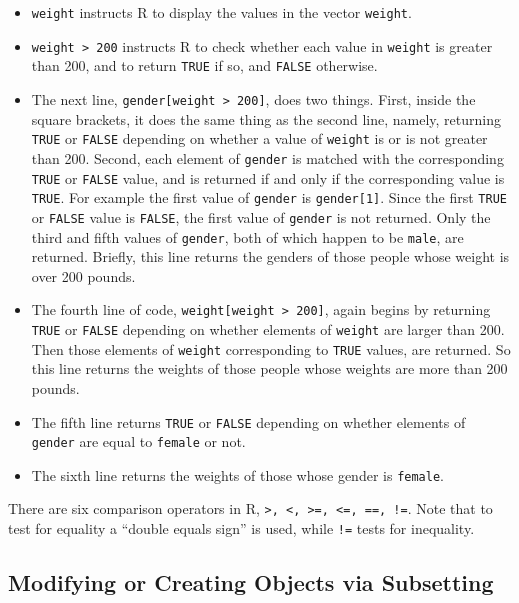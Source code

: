 \documentclass[]{krantz}
\providecommand{\tightlist}{%
  \setlength{\itemsep}{0pt}\setlength{\parskip}{0pt}}
\begin{document}
\begin{itemize}
\tightlist
\item
  \texttt{weight} instructs R to display the values in the vector \texttt{weight}.
\item
  \texttt{weight\ \textgreater{}\ 200} instructs R to check whether each value in \texttt{weight} is greater than 200, and to return \texttt{TRUE} if so, and \texttt{FALSE} otherwise.
\item
  The next line, \texttt{gender{[}weight\ \textgreater{}\ 200{]}}, does two things. First, inside the square brackets, it does the same thing as the second line, namely, returning \texttt{TRUE} or \texttt{FALSE} depending on whether a value of \texttt{weight} is or is not greater than 200. Second, each element of \texttt{gender} is matched with the corresponding \texttt{TRUE} or \texttt{FALSE} value, and is returned if and only if the corresponding value is \texttt{TRUE}. For example the first value of \texttt{gender} is \texttt{gender{[}1{]}}. Since the first \texttt{TRUE} or \texttt{FALSE} value is \texttt{FALSE}, the first value of \texttt{gender} is not returned. Only the third and fifth values of \texttt{gender}, both of which happen to be \texttt{male}, are returned. Briefly, this line returns the genders of those people whose weight is over 200 pounds.
\item
  The fourth line of code, \texttt{weight{[}weight\ \textgreater{}\ 200{]}}, again begins by returning \texttt{TRUE} or \texttt{FALSE} depending on whether elements of \texttt{weight} are larger than 200. Then those elements of \texttt{weight} corresponding to \texttt{TRUE} values, are returned. So this line returns the weights of those people whose weights are more than 200 pounds.
\item
  The fifth line returns \texttt{TRUE} or \texttt{FALSE} depending on whether elements of \texttt{gender} are equal to \texttt{female} or not.
\item
  The sixth line returns the weights of those whose gender is \texttt{female}.
\end{itemize}

There are six comparison operators in R, \texttt{\textgreater{},\ \textless{},\ \textgreater{}=,\ \textless{}=,\ ==,\ !=}. Note that to test for equality a ``double equals sign'' is used, while \texttt{!=} tests for inequality.

\hypertarget{modifying-or-creating-objects-via-subsetting}{%
\subsection{Modifying or Creating Objects via Subsetting}\label{modifying-or-creating-objects-via-subsetting}}
\end{document}
